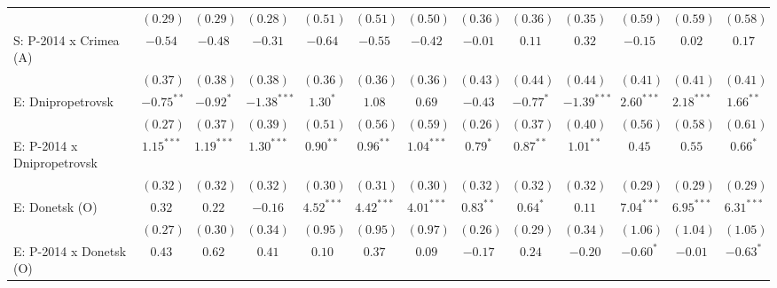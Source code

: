 \begin{table}
\begin{center}
\begin{tiny}
\begin{tabular}{l c c c c c c c c c c c c}
                            & $(0.29)$      & $(0.29)$     & $(0.28)$      & $(0.51)$       & $(0.51)$       & $(0.50)$       & $(0.36)$      & $(0.36)$    & $(0.35)$       & $(0.59)$       & $(0.59)$       & $(0.58)$       \\
S: P-2014 x Crimea (A)      & $-0.54$       & $-0.48$      & $-0.31$       & $-0.64$        & $-0.55$        & $-0.42$        & $-0.01$       & $0.11$      & $0.32$         & $-0.15$        & $0.02$         & $0.17$         \\
                            & $(0.37)$      & $(0.38)$     & $(0.38)$      & $(0.36)$       & $(0.36)$       & $(0.36)$       & $(0.43)$      & $(0.44)$    & $(0.44)$       & $(0.41)$       & $(0.41)$       & $(0.41)$       \\
E: Dnipropetrovsk           & $-0.75^{**}$  & $-0.92^{*}$  & $-1.38^{***}$ & $1.30^{*}$     & $1.08$         & $0.69$         & $-0.43$       & $-0.77^{*}$ & $-1.39^{***}$  & $2.60^{***}$   & $2.18^{***}$   & $1.66^{**}$    \\
                            & $(0.27)$      & $(0.37)$     & $(0.39)$      & $(0.51)$       & $(0.56)$       & $(0.59)$       & $(0.26)$      & $(0.37)$    & $(0.40)$       & $(0.56)$       & $(0.58)$       & $(0.61)$       \\
E: P-2014 x Dnipropetrovsk  & $1.15^{***}$  & $1.19^{***}$ & $1.30^{***}$  & $0.90^{**}$    & $0.96^{**}$    & $1.04^{***}$   & $0.79^{*}$    & $0.87^{**}$ & $1.01^{**}$    & $0.45$         & $0.55$         & $0.66^{*}$     \\
                            & $(0.32)$      & $(0.32)$     & $(0.32)$      & $(0.30)$       & $(0.31)$       & $(0.30)$       & $(0.32)$      & $(0.32)$    & $(0.32)$       & $(0.29)$       & $(0.29)$       & $(0.29)$       \\
E: Donetsk (O)              & $0.32$        & $0.22$       & $-0.16$       & $4.52^{***}$   & $4.42^{***}$   & $4.01^{***}$   & $0.83^{**}$   & $0.64^{*}$  & $0.11$         & $7.04^{***}$   & $6.95^{***}$   & $6.31^{***}$   \\
                            & $(0.27)$      & $(0.30)$     & $(0.34)$      & $(0.95)$       & $(0.95)$       & $(0.97)$       & $(0.26)$      & $(0.29)$    & $(0.34)$       & $(1.06)$       & $(1.04)$       & $(1.05)$       \\
E: P-2014 x Donetsk (O)     & $0.43$        & $0.62$       & $0.41$        & $0.10$         & $0.37$         & $0.09$         & $-0.17$       & $0.24$      & $-0.20$        & $-0.60^{*}$    & $-0.01$        & $-0.63^{*}$    \\

\end{tabular}
\end{tiny}
\end{center}
\end{table}

